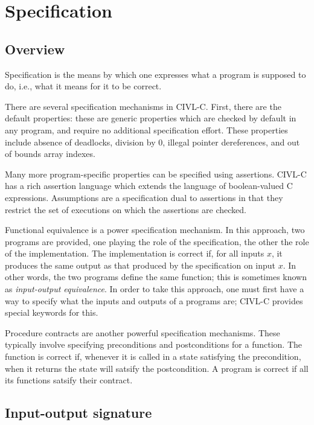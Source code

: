 \chapter{Specification}

\section{Overview}

Specification is the means by which one expresses what a program is
supposed to do, i.e., what it means for it to be correct.

There are several specification mechanisms in CIVL-C. First, there are
the default properties: these are generic properties which are checked
by default in any program, and require no additional specification
effort. These properties include absence of deadlocks, division by 0,
illegal pointer dereferences, and out of bounds array indexes.

Many more program-specific properties can be specified using
assertions. CIVL-C has a rich assertion language which extends the
language of boolean-valued C expressions. Assumptions are a
specification dual to assertions in that they restrict the set
of executions on which the assertions are checked.

Functional equivalence is a power specification mechanism. In this
approach, two programs are provided, one playing the role of the
specification, the other the role of the implementation. The
implementation is correct if, for all inputs $x$, it produces the same
output as that produced by the specification on input $x$. In other
words, the two programs define the same function; this is sometimes
known as \emph{input-output equivalence}. In order to take this
approach, one must first have a way to specify what the inputs and
outputs of a programs are; CIVL-C provides special keywords for this.

Procedure contracts are another powerful specification mechanisms.
These typically involve specifying preconditions and postconditions
for a function. The function is correct if, whenever it is called in a
state satisfying the precondition, when it returns the state will
satsify the postcondition. A program is correct if all its functions
satsify their contract.

\section{Input-output signature}

